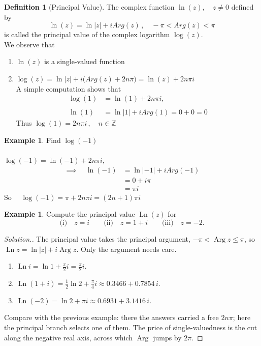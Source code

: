\documentclass[11pt,a4paper]{article}
\theoremstyle{definition}
\newtheorem{definition}[thm]{Definition}
\newtheorem{example}[thm]{Example}
\newenvironment{solution}
  {\renewcommand{\qedsymbol}{}\begin{proof}[\textit{Solution}.]}
  {\end{proof}}
\begin{document}
\pagebreak
\begin{definition}[Principal Value]
The complex function $\ln (z) , \quad  z \neq 0$ defined by 
$$\ln (z) = \ln \left|z\right| + i Arg(z)\,, \quad  -\pi < Arg(z) < \pi$$
is called the principal value of the complex logarithm $\log (z)$.\\

We observe that 
\begin{enumerate}
\item $\ln (z)$ is a single-valued function
\item $\log(z)= \ln \left|z\right| + i\big( Arg(z) + 2n\pi\big) = \ln (z) + 2n\pi i$\\
      
A simple computation shows that 
\begin{align*}
\log (1) & = \ln (1) + 2n\pi i,\\\\
\ln ( 1) & = \ln \left|1\right| + i Arg(1) = 0 + 0  = 0
\end{align*}
Thus $\log (1) = 2n\pi i\,,\quad  n\in \mathbb{Z}$\\
\end{enumerate}
\end{definition}

\begin{example}
Find $\log (-1)$\\

\text{\textcolor{red}{Solution}}\\
$\log (-1) = \ln (-1) + 2n\pi i,$
\begin{align*}
\implies \quad  \ln (-1) & = \ln \left|-1\right|  + i Arg(-1)\\
& = 0 + i \pi\\
& = \pi i
\end{align*}
So $\quad  \log (-1) = \pi + 2n \pi i = (2n + 1)\pi i$
\end{example}

\begin{example}
Compute the principal value $\operatorname{Ln}(z)$ for
$$\text{(i)}\quad z = i\qquad \text{(ii)}\quad z = 1 + i\qquad
\text{(iii)}\quad z = -2 .$$
\end{example}
\begin{solution}
The principal value takes the principal argument, $-\pi<\operatorname{Arg}z\leq
\pi$, so $\operatorname{Ln}z=\ln\left|z\right|+i\operatorname{Arg}z$. Only the
argument needs care.
\begin{enumerate}
\item[(i)] $\operatorname{Ln}i=\ln 1+\frac{\pi}{2}i=\frac{\pi}{2}i$.
\item[(ii)] $\operatorname{Ln}(1+i)=\frac{1}{2}\ln 2+\frac{\pi}{4}i
\approx 0.3466+0.7854\,i$.
\item[(iii)] $\operatorname{Ln}(-2)=\ln 2+\pi i\approx 0.6931+3.1416\,i$.
\end{enumerate}
Compare with the previous example: there the answers carried a free $2n\pi$;
here the principal branch selects one of them. The price of single-valuedness
is the cut along the negative real axis, across which $\operatorname{Arg}$
jumps by $2\pi$.
\end{solution}
\end{document}
